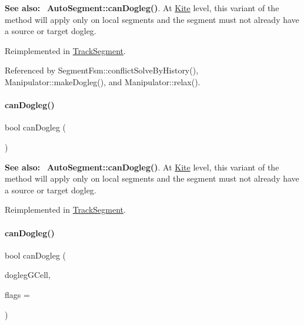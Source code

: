 {\bfseries See also\+:}~ \textbf{ Auto\+Segment\+::can\+Dogleg()}. At \hyperlink{namespaceKite}{Kite} level, this variant of the method will apply only on local segments and the segment must not already have a source or target dogleg. 

Reimplemented in \hyperlink{classKite_1_1TrackSegment_aa0bb6f1592688e942ff67e0ac318a4fd}{Track\+Segment}.



Referenced by Segment\+Fsm\+::conflict\+Solve\+By\+History(), Manipulator\+::make\+Dogleg(), and Manipulator\+::relax().

\mbox{\label{classKite_1_1TrackElement_accb4c6a7ee2678a0cff4dbc4a7860fe1}} 
\paragraph{\texorpdfstring{can\+Dogleg()}{canDogleg()}\hspace{0.1cm}{\footnotesize\ttfamily [2/3]}}
{\footnotesize\ttfamily bool can\+Dogleg (\begin{DoxyParamCaption}\item[{\textbf{ Interval}}]{ }\end{DoxyParamCaption})\hspace{0.3cm}{\ttfamily [virtual]}}

{\bfseries See also\+:}~ \textbf{ Auto\+Segment\+::can\+Dogleg()}. At \hyperlink{namespaceKite}{Kite} level, this variant of the method will apply only on local segments and the segment must not already have a source or target dogleg. 

Reimplemented in \hyperlink{classKite_1_1TrackSegment_accb4c6a7ee2678a0cff4dbc4a7860fe1}{Track\+Segment}.

\mbox{\label{classKite_1_1TrackElement_a4f040cf33009e4886d401115c3bea838}} 
\paragraph{\texorpdfstring{can\+Dogleg()}{canDogleg()}\hspace{0.1cm}{\footnotesize\ttfamily [3/3]}}
{\footnotesize\ttfamily bool can\+Dogleg (\begin{DoxyParamCaption}\item[{\textbf{ Katabatic\+::\+G\+Cell} $\ast$}]{dogleg\+G\+Cell,  }\item[{unsigned int}]{flags = {} }\end{DoxyParamCaption})\hspace{0.3cm}{\ttfamily [virtual]}}

